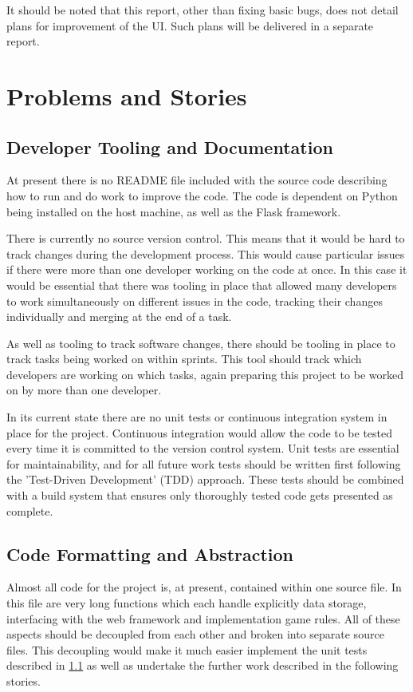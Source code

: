 \documentclass[a4paper,12pt]{article}
\begin{document}
It should be noted that this report, other than fixing basic bugs, does not detail plans for improvement of the UI. Such plans will be delivered in a separate report.

\section{Problems and Stories}
\label{stories}
\subsection{Developer Tooling and Documentation} \label{tooling}

At present there is no README file included with the source code describing how to run and do work to improve the code. The code is dependent on Python being installed on the host machine, as well as the Flask framework. 

There is currently no source version control. This means that it would be hard to track changes during the development process. This would cause particular issues if there were more than one developer working on the code at once. In this case it would be essential that there was tooling in place that allowed many developers to work simultaneously on different issues in the code, tracking their changes individually and merging at the end of a task.

As well as tooling to track software changes, there should be tooling in place to track tasks being worked on within sprints. This tool should track which developers are working on which tasks, again preparing this project to be worked on by more than one developer.

In its current state there are no unit tests or continuous integration system in place for the project. Continuous integration would allow the code to be tested every time it is committed to the version control system. Unit tests are essential for maintainability, and for all future work tests should be written first following the 'Test-Driven Development' (TDD) \cite{agiletdd} approach. These tests should be combined with a build system that ensures only thoroughly tested code gets presented as complete.

\subsection{Code Formatting and Abstraction}
\label{format}
Almost all code for the project is, at present, contained within one source file. In this file are very long functions which each handle explicitly data storage, interfacing with the web framework and implementation game rules. All of these aspects should be decoupled from each other and broken into separate source files. This decoupling would make it much easier implement the unit tests described in \ref{tooling} as well as undertake the further work described in the following stories.
\end{document}
